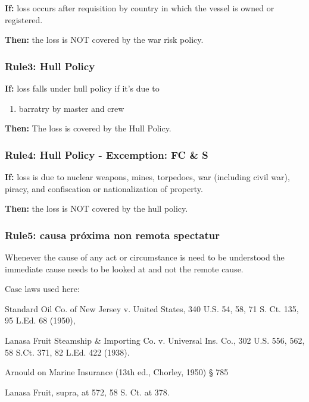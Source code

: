     \textbf{If:} loss occurs after requisition by country in which the vessel is owned or registered.
    
    \textbf{Then:} the loss is NOT covered by the war risk policy.
    
\subsubsection{Rule3: Hull Policy}

    
    \textbf{If:} loss falls under hull policy if it's due to
    \begin{enumerate}
        \item barratry by master and crew
    \end{enumerate}
    
    \textbf{Then:} The loss is covered by the Hull Policy.

\subsubsection{ Rule4: Hull Policy - Excemption: FC \& S}

    
    \textbf{If:} loss is due to nuclear weapons, mines, torpedoes, war (including civil war), piracy, and confiscation or nationalization of property.
    
    \textbf{Then:} the loss is NOT covered by the hull policy.


\subsubsection{Rule5: causa próxima non remota spectatur}

Whenever the cause of any act or circumstance is need to be understood the immediate cause needs to be looked at and not the remote cause.

Case laws used here:

Standard Oil Co. of New Jersey v. United States, 340 U.S. 54, 58, 71 S. Ct. 135, 95 L.Ed. 68 (1950),

Lanasa Fruit Steamship \& Importing Co. v. Universal Ins. Co., 302 U.S. 556, 562, 58 S.Ct. 371, 82 L.Ed. 422 (1938).

Arnould on Marine Insurance (13th ed., Chorley, 1950) § 785

Lanasa Fruit, supra, at 572, 58 S. Ct. at 378.

